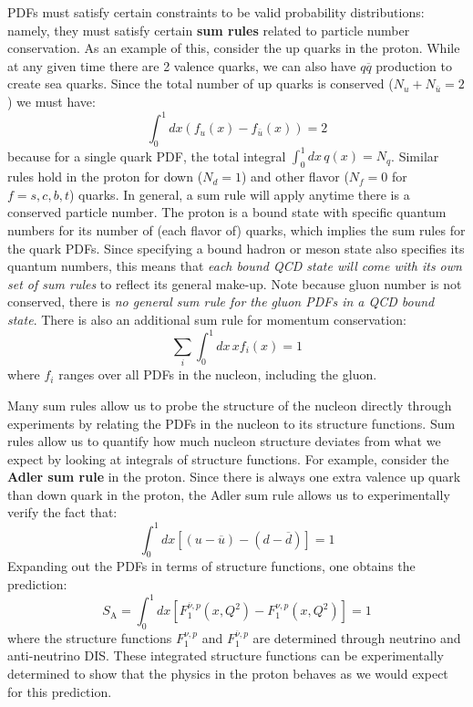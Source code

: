 \documentclass[11pt, oneside]{article}   	%
\theoremstyle{definition}
\begin{document}
PDFs must satisfy certain constraints to be valid probability distributions: namely, they must satisfy certain \textbf{sum rules} 
related to particle number conservation. As an example of this, consider the up quarks in the proton. While at any given time 
there are 2 valence quarks, we can also have $q\overline q$ production to create sea quarks. Since the total number of up 
quarks is conserved ($N_u + N_{\bar u} = 2$) we must have:
\begin{equation}
	\int_0^1dx \left(f_{u}(x) - f_{\bar u}(x)\right) = 2
\end{equation}
because for a single quark PDF, the total integral $\int_0^1dx\,q(x) = N_q$. Similar rules hold in the proton for down ($N_d = 
1$) and other flavor ($N_f = 0$ for $f = s, c, b, t$) quarks. In general, a sum rule will apply anytime there is a conserved particle 
number. The proton is a bound state with specific quantum numbers for its number of (each flavor of) quarks, which implies the 
sum rules for the quark PDFs. Since specifying a bound hadron or meson state also specifies its quantum numbers, this 
means that \textit{each bound QCD state will come with its own set of sum rules} to reflect its general make-up. Note because 
gluon number is not conserved, there is \textit{no general sum rule for the gluon PDFs in a QCD bound state}. There is also an 
additional sum rule for momentum conservation:
\begin{equation}
	\sum_i \int_0^1 dx\, x f_i(x) = 1
\end{equation}
where $f_i$ ranges over all PDFs in the nucleon, including the gluon. 

Many sum rules allow us to probe the structure of the nucleon directly through experiments by relating the PDFs in the nucleon to its 
structure functions. Sum rules allow us to quantify how much nucleon structure deviates from what we expect by looking at integrals of 
structure functions. For example, consider the \textbf{Adler sum rule} in the proton. Since there 
is always one extra valence up quark than down quark in the proton, the Adler sum rule allows us to experimentally verify the fact that:
\begin{equation}
	\int_0^1dx\left[(u - \overline u) - (d - \overline d)\right] = 1
\end{equation}
Expanding out the PDFs in terms of structure functions, one obtains the prediction:
\begin{equation}
	S_\mathrm{A} = \int_0^1dx\left[ F_1^{\overline \nu, p}(x, Q^2) - F_1^{\nu, p}(x, Q^2)\right] = 1
\end{equation}
where the structure functions $F_1^{\nu, p}$ and $F_1^{\overline\nu, p}$ are determined through neutrino and anti-neutrino DIS. These 
integrated structure functions can be experimentally determined to show that the physics in the proton behaves as we would expect for 
this prediction.
\end{document}
